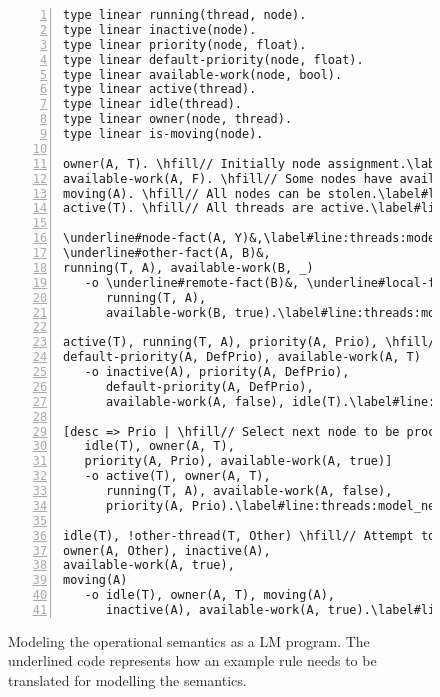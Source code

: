 \begin{figure}[h!]
\begin{Verbatim}[numbers=left,fontsize=\codesize,commandchars=\\\#\&]
type linear running(thread, node).
type linear inactive(node).
type linear priority(node, float).
type linear default-priority(node, float).
type linear available-work(node, bool).
type linear active(thread).
type linear idle(thread).
type linear owner(node, thread).
type linear is-moving(node).

owner(A, T). \hfill// Initially node assignment.\label#line:threads:model_owner&
available-work(A, F). \hfill// Some nodes have available work.\label#line:threads:model_available&
moving(A). \hfill// All nodes can be stolen.\label#line:threads:model_moving&
active(T). \hfill// All threads are active.\label#line:threads:model_active&

\underline#node-fact(A, Y)&,\label#line:threads:model_rule1&\hfill // Program rules go here.
\underline#other-fact(A, B)&,
running(T, A), available-work(B, _)
   -o \underline#remote-fact(B)&, \underline#local-fact(A)&,
      running(T, A),
      available-work(B, true).\label#line:threads:model_rule2&

active(T), running(T, A), priority(A, Prio), \hfill// Switching to another node.\label#line:threads:model_drop_node1&
default-priority(A, DefPrio), available-work(A, T)
   -o inactive(A), priority(A, DefPrio),
      default-priority(A, DefPrio),
      available-work(A, false), idle(T).\label#line:threads:model_drop_node2&

[desc => Prio | \hfill// Select next node to be processed.\label#line:threads:model_next_node1&
   idle(T), owner(A, T),
   priority(A, Prio), available-work(A, true)]
   -o active(T), owner(A, T),
      running(T, A), available-work(A, false),
      priority(A, Prio).\label#line:threads:model_next_node2&

idle(T), !other-thread(T, Other) \hfill// Attempt to steal a node.\label#line:threads:model_steal1&
owner(A, Other), inactive(A),
available-work(A, true),
moving(A)
   -o idle(T), owner(A, T), moving(A),
      inactive(A), available-work(A, true).\label#line:threads:model_steal2&
\end{Verbatim}
\caption{Modeling the operational semantics as a LM program. The underlined code
represents how an example rule  needs to be translated for modelling the semantics.}
\label{code:threads:modeling}
\end{figure}

